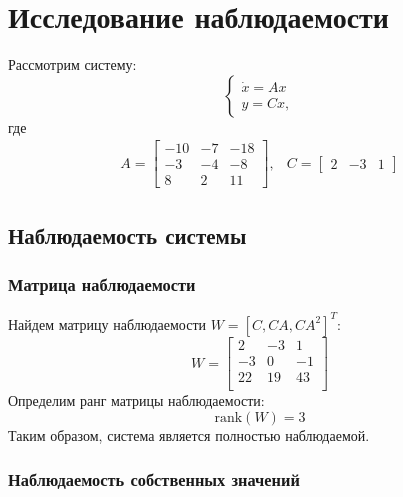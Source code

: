 \section{Исследование наблюдаемости}

Рассмотрим систему: 
\begin{equation}
    \begin{cases}
        \dot{x} = Ax \\
        y = Cx,
    \end{cases}
\end{equation}
где 
\begin{equation}
    \begin{array}{cc}
        A = \begin{bmatrix}
            -10 & -7 & -18 \\
            -3 & -4 & -8 \\
            8 & 2 & 11
        \end{bmatrix}, &
        C = \begin{bmatrix}
            2 & -3 & 1
        \end{bmatrix}
    \end{array}
\end{equation}

\subsection{Наблюдаемость системы}

\subsubsection{Матрица наблюдаемости}
Найдем матрицу наблюдаемости $W = [C, CA, CA^2]^T$: 
\begin{equation}
    W = \begin{bmatrix}
        2  & -3  & 1 \\ 
        -3  & 0  & -1 \\ 
        22  & 19  & 43 \\ 
    \end{bmatrix}
\end{equation}
Определим ранг матрицы наблюдаемости:
\begin{equation}
    \text{rank}(W) = 3
\end{equation}
Таким образом, система является полностью наблюдаемой.

\subsubsection{Наблюдаемость собственных значений}

